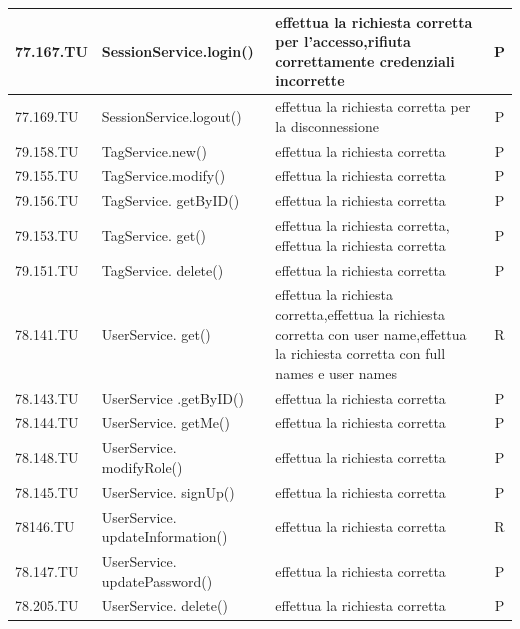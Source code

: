 \documentclass[12pt,a4paper]{article}
\begin{document}
\begin{center}
\begin{longtable}[]{l l p{} c}
	77.167.TU& SessionService.login() & effettua la richiesta corretta per l'accesso,rifiuta correttamente credenziali incorrette & P\\ \midrule
	77.169.TU& SessionService.logout() & effettua la richiesta corretta per la disconnessione & P\\ \midrule
	79.158.TU& TagService.new() & effettua la richiesta corretta & P\\ \midrule
	79.155.TU& TagService.modify() & effettua la richiesta corretta & P\\ \midrule
	79.156.TU& TagService. getByID() & effettua la richiesta corretta & P\\ \midrule
	79.153.TU& TagService. get() & effettua la richiesta corretta, effettua la richiesta corretta & P\\ \midrule
	79.151.TU& TagService. delete() & effettua la richiesta corretta& P\\ \midrule
	78.141.TU& UserService. get() & effettua la richiesta corretta,effettua la richiesta corretta con user name,effettua la richiesta corretta con full names e user names & R\\ \midrule
	78.143.TU& UserService .getByID() & effettua la richiesta corretta & P\\ \midrule
	78.144.TU& UserService. getMe() & effettua la richiesta corretta& P\\ \midrule
	78.148.TU& UserService. modifyRole() & effettua la richiesta corretta & P\\ \midrule
	78.145.TU& UserService. signUp() & effettua la richiesta corretta & P\\ \midrule
	78146.TU& UserService. updateInformation() & effettua la richiesta corretta & R\\ \midrule
78.147.TU	& UserService. updatePassword() & effettua la richiesta corretta& P\\ \midrule
	78.205.TU& UserService. delete() & effettua la richiesta corretta& P\\ \midrule
	
	
\end{longtable}
\end{center}
\end{document}
